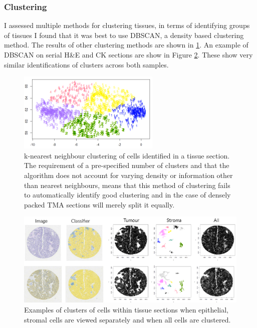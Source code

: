 \subsubsection*{Clustering}
I assessed multiple methods for clustering tissues, in terms of identifying groups of tissues I found that it was best to use DBSCAN, a density based clustering method. The results of other clustering methods are shown in \ref{fig:clust_bad}. An example of DBSCAN on serial H\&E and CK sections are show in Figure \ref{fig:dbclust}. These show very similar identifications of clusters across both samples.

\begin{figure}
    \centering
    \includegraphics{Chapter3/Figs/knn_example_2.png}
    \caption[k-nearest neighbour clustering of cells]{k-nearest neighbour clustering of cells identified in a tissue section. The requirement of a pre-specified number of clusters and that the algorithm does not account for varying density or information other than nearest neighbours, means that this method of clustering fails to automatically identify good clustering and in the case of densely packed TMA sections will merely split it equally.}
    \label{fig:clust_bad}
\end{figure}

\begin{figure}
    \centering
    \includegraphics[width=\textwidth]{Chapter3/Figs/dbscan_fullexample.png}
    \caption{Examples of clusters of cells within tissue sections when epithelial, stromal cells are viewed separately and when all cells are clustered.}
    \label{fig:dbclust}
\end{figure}

